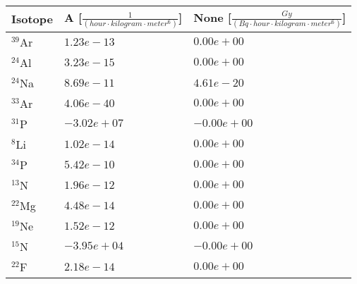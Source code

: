 \begin{tabular}{lll}
\hline
 Isotope   & A [$\frac{1}{\left(hour \cdot kilogram \cdot meter^{6}\right)}$]   & None [$\frac{Gy}{\left(Bq \cdot hour \cdot kilogram \cdot meter^{6}\right)}$]   \\
\hline
 $^{39}$Ar & $1.23e-13 $                                                        & $0.00e+00 $                                                                     \\
 $^{24}$Al & $3.23e-15 $                                                        & $0.00e+00 $                                                                     \\
 $^{24}$Na & $8.69e-11 $                                                        & $4.61e-20 $                                                                     \\
 $^{33}$Ar & $4.06e-40 $                                                        & $0.00e+00 $                                                                     \\
 $^{31}$P  & $-3.02e+07 $                                                       & $-0.00e+00 $                                                                    \\
 $^{8}$Li  & $1.02e-14 $                                                        & $0.00e+00 $                                                                     \\
 $^{34}$P  & $5.42e-10 $                                                        & $0.00e+00 $                                                                     \\
 $^{13}$N  & $1.96e-12 $                                                        & $0.00e+00 $                                                                     \\
 $^{22}$Mg & $4.48e-14 $                                                        & $0.00e+00 $                                                                     \\
 $^{19}$Ne & $1.52e-12 $                                                        & $0.00e+00 $                                                                     \\
 $^{15}$N  & $-3.95e+04 $                                                       & $-0.00e+00 $                                                                    \\
 $^{22}$F  & $2.18e-14 $                                                        & $0.00e+00 $                                                                     \\

\end{tabular}
